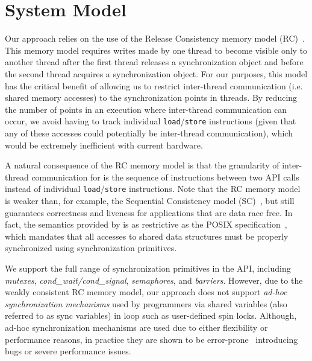\section{System Model}
\label{sec:model}

 Our approach relies on the use of the
Release Consistency memory model (RC)~\cite{DSM-RC}. This memory model 
requires writes made by one thread to become visible only to another thread after the
first thread releases a synchronization object and before the second thread
acquires a synchronization object. For our purposes, this model has the critical
benefit of allowing us to restrict inter-thread communication (i.e. shared
memory accesses) to the synchronization points in threads. By reducing the number of 
points in an execution where inter-thread communication can occur, we avoid
having to track individual {\tt load}/{\tt store} instructions (given that any of these
accesses could potentially be inter-thread communication), which would 
be extremely inefficient with current hardware. 

A natural consequence of the RC memory model is that the granularity of inter-thread communication  for \projecttitle is the sequence of instructions between two \pthreads API calls instead of  individual {\tt load}/{\tt store} instructions. Note that the RC memory model is weaker
than, for example, the Sequential Consistency model (SC)~\cite{scLamport}, but
still guarantees correctness and liveness for applications that are data race
free. In fact,  the semantics provided by
\projecttitle is as restrictive as the POSIX specification~\cite{pthreads-spec}, which mandates that all accesses to shared data structures must be properly synchronized using 
\pthreads synchronization primitives. 

 We support the full range of synchronization
primitives in the \pthreads API, including {\em mutexes}, {\em cond\_wait/cond\_signal}, {\em semaphores},  and {\em
barriers}. However, due to the weakly consistent RC memory model, our approach
does not support {\em ad-hoc synchronization mechanisms} used by programmers via
shared variables (also referred to as sync variables) in loop such as user-defined spin locks. 
Although, ad-hoc synchronization mechanisms are used due to either flexibility
or performance reasons, in practice they are shown to be
error-prone~\cite{adhoc-sync} introducing bugs or severe performance issues.